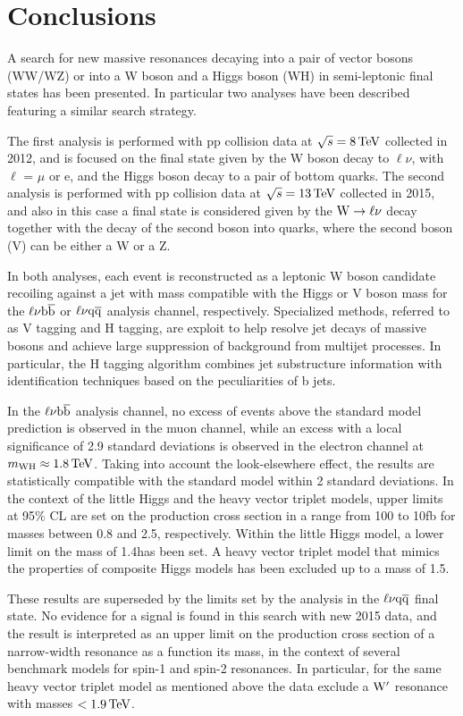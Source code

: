 \chapter{Conclusions}

A search for new massive resonances decaying into a pair of vector bosons (WW/WZ) or into a W boson and a Higgs boson (WH)
in semi-leptonic final states has been presented. In particular two analyses have been described featuring a similar search strategy.

The first analysis is performed with pp collision data at $\sqrt{s} = 8\,\text{Te\hspace{-.08em}V}$ collected in 2012, and is focused on the final state given by the W boson decay to $\ell\nu$, with $\ell$ = $\mu$ or e,
and the Higgs boson decay to a pair of bottom quarks.
The second analysis is performed with pp collision data at $\sqrt{s} = 13\,\text{Te\hspace{-.08em}V}$ collected in 2015, and also in this case a final state is considered given by the $\mathrm{W}\to\ell\nu$ decay together with the decay of the second boson into quarks, where the second boson (V) can be either a W or a Z. 

In both analyses, each event is reconstructed as a leptonic W boson candidate recoiling against a jet with mass compatible with the Higgs or V boson mass for the $\ell\nu{\mathrm{b}\overline{\mathrm{b}}}$ or $\ell\nu\mathrm{q}\overline{\mathrm{q}}$ analysis channel, respectively.
Specialized methods, referred to as V tagging and H tagging, are exploit to help resolve jet decays of massive bosons and achieve large suppression of background from multijet processes.
In particular, the H tagging algorithm combines jet substructure information with identification techniques based on the peculiarities of b jets.

In the $\ell\nu{\mathrm{b}\overline{\mathrm{b}}}$ analysis channel, no excess of events above the standard model prediction is observed in the muon channel,
while an excess with a local significance of 2.9 standard deviations is observed in the electron channel at $m_{\rm WH} \approx 1.8\,\text{Te\hspace{-.08em}V}$.
Taking into account the look-elsewhere effect, the results are statistically compatible with the standard model within 2 standard deviations.
In the context of the little Higgs and the heavy vector triplet models, upper limits at 95\% CL are set on the \Wpr production cross section
in a range from 100 to 10\unit{fb} for masses between 0.8 and 2.5\TeV, respectively.
Within the little Higgs model, a lower limit on the \Wpr mass of 1.4\TeV has been set.
A heavy vector triplet model that mimics the properties of composite Higgs models has been excluded up to a \Wpr mass of 1.5\TeV.

These results are superseded by the limits set by the analysis in the $\ell\nu\mathrm{q}\overline{\mathrm{q}}$ final state.
No evidence for a signal is found in this search with new 2015 data, and the result is interpreted as an upper limit on the production cross section of a narrow-width resonance as a function its mass,
in the context of several benchmark models for spin-1 and spin-2 resonances. In particular, for the same heavy vector triplet model as mentioned above the data exclude a $\mathrm{W}^\prime$ resonance with masses $< 1.9\,\text{Te\hspace{-.08em}V}$.

